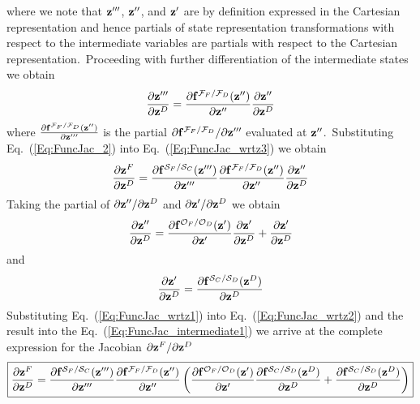 %
where we note that $\mathbf{z}'''$, $\mathbf{z}''$, and $\mathbf{z}'$ are by definition expressed in the Cartesian representation and hence partials of state representation transformations with respect to the intermediate variables are partials with respect to the Cartesian representation.~Proceeding with further differentiation of the intermediate states we obtain
%
\begin{equation}
   \frac{\partial \mathbf{z}'''}{\partial \mathbf{z}^D} =  \frac{\partial \mathbf{f}^{\mathcal{F}_F / \mathcal{F}_D}(\mathbf{z}'')}{\partial \mathbf{z}''} \frac{\partial \mathbf{z}''}{\partial \mathbf{z}^D} \label{Eq:FuncJac_2}
\end{equation}
%
where $\frac{\partial \mathbf{f}^{\mathcal{F}_F / \mathcal{F}_D}(\mathbf{z}'')}{\partial \mathbf{z}'''}$ is the partial $\partial \mathbf{f}^{\mathcal{F}_F / \mathcal{F}_D} / \partial \mathbf{z}'''$ evaluated at $\mathbf{z}''$.~Substituting Eq.~(\ref{Eq:FuncJac_2}) into Eq.~(\ref{Eq:FuncJac_wrtz3}) we obtain
%
\begin{equation}
   \frac{\partial \mathbf{z}^{F}}{\partial\mathbf{z}^{D}} = \frac{\partial \mathbf{f}^{\mathcal{S}_F / \mathcal{S}_C}(\mathbf{z}''')}{\partial\mathbf{z}'''}\frac{\partial \mathbf{f}^{\mathcal{F}_F / \mathcal{F}_D}(\mathbf{z}'')}{\partial \mathbf{z}''} \frac{\partial \mathbf{z}''}{\partial \mathbf{z}^D} \label{Eq:FuncJac_intermediate1}
\end{equation}
%
Taking the partial of $\partial \mathbf{z}'' / \partial \mathbf{z}^D$ and $\partial \mathbf{z}' / \partial \mathbf{z}^D$ we obtain
%
\begin{equation}
   \frac{\partial \mathbf{z}''}{\partial \mathbf{z}^D} =  \frac{\partial \mathbf{f}^{\mathcal{O}_F / \mathcal{O}_D}(\mathbf{z}')}{\partial \mathbf{z}'}\frac{\partial \mathbf{z}'}{\partial \mathbf{z}^D} + \frac{\partial \mathbf{z}'}{\partial \mathbf{z}^D} \label{Eq:FuncJac_wrtz2}
\end{equation}
%
and
\begin{equation}
   \frac{\partial \mathbf{z}'}{\partial \mathbf{z}^D} =  \frac{\partial \mathbf{f}^{\mathcal{S}_C / \mathcal{S}_D} (\mathbf{z}^D)}{\partial \mathbf{z}^D} \label{Eq:FuncJac_wrtz1}
\end{equation}
%
Substituting Eq.~(\ref{Eq:FuncJac_wrtz1}) into Eq.~(\ref{Eq:FuncJac_wrtz2}) and the result into the Eq.~(\ref{Eq:FuncJac_intermediate1}) we arrive at the complete expression for the Jacobian $\partial \mathbf{z}^{F} / \partial\mathbf{z}^{D}$
%
\begin{equation}
\boxed{
   \frac{\partial \mathbf{z}^{F}}{\partial\mathbf{z}^{D}} = \frac{\partial \mathbf{f}^{\mathcal{S}_F / \mathcal{S}_C}(\mathbf{z}''')}{\partial\mathbf{z}'''}\frac{\partial \mathbf{f}^{\mathcal{F}_F / \mathcal{F}_D}(\mathbf{z}'')}{\partial \mathbf{z}''} \left(\frac{\partial \mathbf{f}^{\mathcal{O}_F / \mathcal{O}_D}(\mathbf{z}')}{\partial \mathbf{z}'}  \frac{\partial \mathbf{f}^{\mathcal{S}_C / \mathcal{S}_D} (\mathbf{z}^D)}{\partial \mathbf{z}^D} + \frac{\partial \mathbf{f}^{\mathcal{S}_C / \mathcal{S}_D} (\mathbf{z}^D)}{\partial \mathbf{z}^D} \right)} \label{Eq:FuncJac_complete}
\end{equation}

